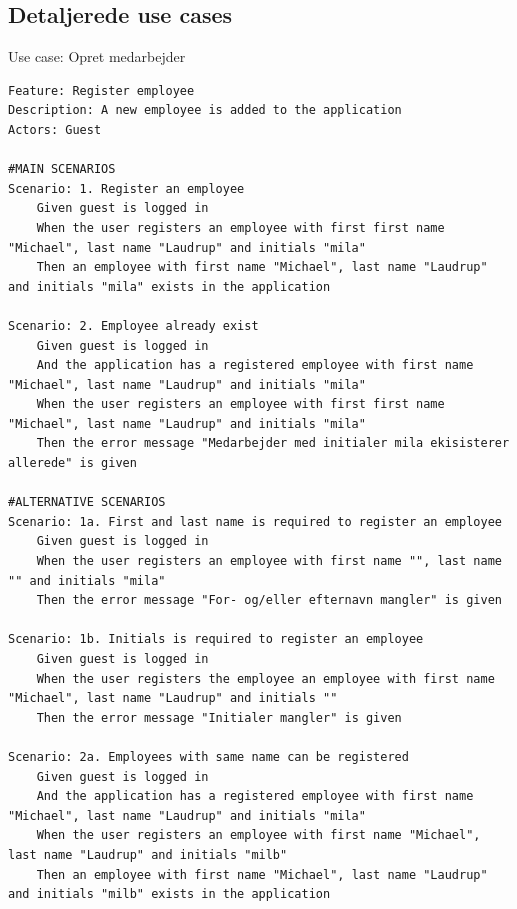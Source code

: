 \subsection{Detaljerede use cases}
\begin{listing}[H]
    \centering
    \caption{Use case: Opret medarbejder}\label{lst:usecase_register_employee}
    \begin{verbatim}  
Feature: Register employee
Description: A new employee is added to the application
Actors: Guest

#MAIN SCENARIOS
Scenario: 1. Register an employee
    Given guest is logged in
    When the user registers an employee with first first name "Michael", last name "Laudrup" and initials "mila"
    Then an employee with first name "Michael", last name "Laudrup" and initials "mila" exists in the application

Scenario: 2. Employee already exist
    Given guest is logged in
    And the application has a registered employee with first name "Michael", last name "Laudrup" and initials "mila"
    When the user registers an employee with first first name "Michael", last name "Laudrup" and initials "mila"
    Then the error message "Medarbejder med initialer mila ekisisterer allerede" is given

#ALTERNATIVE SCENARIOS
Scenario: 1a. First and last name is required to register an employee
    Given guest is logged in
    When the user registers an employee with first name "", last name "" and initials "mila"
    Then the error message "For- og/eller efternavn mangler" is given

Scenario: 1b. Initials is required to register an employee
    Given guest is logged in
    When the user registers the employee an employee with first name "Michael", last name "Laudrup" and initials ""
    Then the error message "Initialer mangler" is given

Scenario: 2a. Employees with same name can be registered
    Given guest is logged in
    And the application has a registered employee with first name "Michael", last name "Laudrup" and initials "mila"
    When the user registers an employee with first name "Michael", last name "Laudrup" and initials "milb"
    Then an employee with first name "Michael", last name "Laudrup" and initials "milb" exists in the application
    \end{verbatim}
\end{listing}
